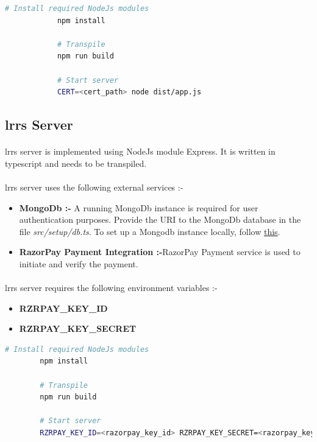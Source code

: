 \documentclass{article}
\begin{document}
        \begin{lstlisting}[language=bash, caption=Verification Server]
            # Install required NodeJs modules
            npm install
        
            # Transpile
            npm run build
        
            # Start server
            CERT=<cert_path> node dist/app.js
            \end{lstlisting}
    
    \subsection{\gls{lrrs} Server}
        \paragraph{}
        \gls{lrrs} server is implemented using NodeJs module Express. It is written in typescript and needs to be transpiled.
    
        \paragraph{}
        \gls{lrrs} server uses the following external services :-
        \begin{itemize}
            \item \textbf{MongoDb :-} A running MongoDb instance is required for user authentication purposes. Provide the URI to the MongoDb database in the file \textit{src/setup/db.ts}. To set up a Mongodb instance locally, follow \href{https://docs.mongodb.com/manual/installation/}{this}.
            \item \textbf{RazorPay Payment Integration :-}RazorPay Payment service is used to initiate and verify the payment.
        \end{itemize}
    
        \paragraph{}
        \gls{lrrs} server requires the following environment variables :-
        \begin{itemize}
            \item \textbf{RZRPAY\_KEY\_ID}
            \item \textbf{RZRPAY\_KEY\_SECRET}
        \end{itemize}
        
        \begin{lstlisting}[language=bash, caption=\gls{lrrs} Server]
        # Install required NodeJs modules
        npm install
    
        # Transpile
        npm run build
    
        # Start server
        RZRPAY_KEY_ID=<razorpay_key_id> RZRPAY_KEY_SECRET=<razorpay_key_secret> node dist/main.js
        \end{lstlisting}
    
\end{document}
